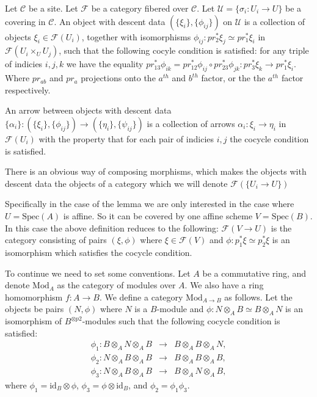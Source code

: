 \begin{definition}
\label{definition-category-descent-datum}
Let $\mathcal C$ be a site.  Let $\mathcal F$ be a category fibered over
$\mathcal C$.  Let $\mathcal U = \{\sigma_i : U_i \rightarrow U\}$ be a
covering in $\mathcal C$.  An object with descent data
$(\{\xi_i\}, \{\phi_{ij}\})$ on $\mathcal U$ is a collection of objects
$\xi_i \in \mathcal F(U_i)$, together with isomorphisms
$\phi_{ij}: pr_2^*\xi_j \simeq pr_1^*\xi_i$ in
$\mathcal F(U_i \times_U U_j)$, such that the following cocyle condition
is satisfied:  for any triple of indicies $i, j, k$ we have the equality
$pr_{13}^*\phi_{ik} = pr_{12}^*\phi_{ij} \circ pr_{23}^*\phi_{jk}: 
pr_3^*\xi_k \rightarrow pr_1^*\xi_i$.  Where $pr_{ab}$ and $pr_a$
projections onto the $a^{th}$ and $b^{th}$ factor, or the the $a^{th}$
factor respectively.

\smallskip\noindent
An arrow between objects with descent data
$\{\alpha_i\}: (\{\xi_i\},\{\phi_{ij}\}) \rightarrow
(\{\eta_i\},\{\psi_{ij}\})$ is a collection of arrows
$\alpha_i : \xi_i \rightarrow \eta_i$ in $\mathcal F(U_i)$ with the property
that for each pair of indicies $i,j$ the cocycle condition is satisfied.

\smallskip\noindent
There is an obvious way of composing morphisms, which makes the objects with
descent data the objects of a category which we will denote
$\mathcal F(\{U_i \rightarrow U\})$

\smallskip\noindent
Specifically in the case of the lemma we are only interested in the case where
$U = \text{Spec}(A)$ is affine.  So it can be covered by one affine scheme
$V=\text{Spec}(B)$.  In this case the above definition reduces to the
following:  $\mathcal F(V \rightarrow U)$ is the category consisting of pairs
$(\xi, \phi)$ where $\xi \in \mathcal F(V)$ and
$\phi: p_1^*\xi  \simeq p_2^*\xi$ is an isomorphism which satisfies the
cocycle condition. 
\end{definition}

\noindent
To continue we need to set some conventions.  Let $A$ be a commutative ring,
and denote $\text{Mod}_A$ as the category of modules over $A$.  We also have a ring
homomorphism $f: A \rightarrow B$.  We define a category
$\text{Mod}_{A\rightarrow B}$ as follows.  Let the objects be pairs $(N,\phi)$
where $N$ is a $B$-module and $\phi:  N \otimes_A B \simeq B \otimes_A N$
is an isomorphism of $B^{\otimes p2}$-modules such that the following cocycle
condition is satisfied:  
\begin{eqnarray}
\phi_1: B \otimes_A N \otimes_A B & \rightarrow & B \otimes_A B \otimes_A N,
\nonumber\\
\phi_2: N \otimes_A B \otimes_A B & \rightarrow & B \otimes_A B \otimes_A B,
\nonumber\\
\phi_3: N \otimes_A B \otimes_A B & \rightarrow & B \otimes_A N \otimes_A B,
\nonumber
\end{eqnarray}
where $\phi_1 = \text{id}_B \otimes \phi$, $\phi_3 = \phi \otimes \text{id}_B$, and
$\phi_2 = \phi_1\phi_3$.

